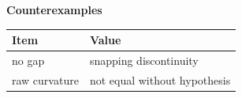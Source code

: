 \begin{center}
\textbf{Counterexamples}\par\smallskip
\begin{tabular}{ll}
\toprule
Item & Value \\
\midrule
no gap & snapping discontinuity \\
raw curvature & not equal without hypothesis \\
\bottomrule
\end{tabular}
\end{center}
